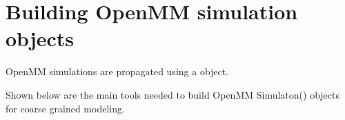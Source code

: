 \documentclass[letterpaper,12pt,english,openany,oneside]{sphinxmanual}
\begin{document}
\section{Building OpenMM simulation objects}
\label{\detokenize{simulation:building-openmm-simulation-objects}}
OpenMM simulations are propagated using a  object.

Shown below are the main tools needed to build OpenMM Simulaton() objects for coarse grained modeling.

\label{\detokenize{simulation:module-simulation.tools}}
\end{document}
